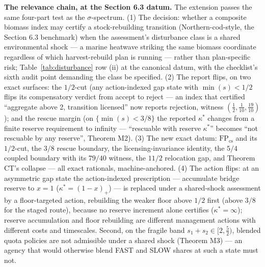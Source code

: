 \documentclass[3p,11pt]{elsarticle}
\begin{document}
\textbf{The relevance chain, at the Section 6.3 datum.} The extension
passes the same four-part test as the \(\sigma\)-spectrum. (1) The
decision: whether a composite biomass index may certify a
stock-rebuilding transition (Northern-cod-style, the Section 6.3
benchmark) when the assessment's disturbance class is a shared
environmental shock --- a marine heatwave striking the same biomass
coordinate regardless of which harvest-rebuild plan is running ---
rather than plan-specific risk; Table~\ref{tab:disturbance} row (ii) at
the canonical datum, with the checklist's sixth audit point demanding
the class be specified. (2) The report flips, on two exact surfaces: the
\(1/2\)-cut (any action-indexed gap state with \(\min(s) < 1/2\)
flips its compensatory verdict from accept to reject --- an index that
certified ``aggregate above 2, transition licensed'' now reports
rejection, witness \((\tfrac12, \tfrac1{10}, \tfrac{19}{10})\)); and
the rescue margin (on \(\{\min(s) < 3/8\}\) the reported
\(\kappa^*\) changes from a finite reserve requirement to infinity
--- ``rescuable with reserve \(\kappa^*\)'' becomes ``not rescuable
by any reserve'', Theorem M2). (3) The new exact datum:
\(\mathrm{FP}_{\mathrm{cs}}\) and its \(1/2\)-cut, the \(3/8\)
rescue boundary, the licensing-invariance identity, the \(5/4\)
coupled boundary with its \(79/40\) witness, the \(11/2\)
relocation gap, and Theorem CT's collapse --- all exact rationals,
machine-anchored. (4) The action flips: at an asymmetric gap state the
action-indexed prescription --- accumulate bridge reserve to \(x =
1\) (\(\kappa^* = (1 - x)_+\)) --- is replaced under a shared-shock
assessment by a floor-targeted action, rebuilding the weaker floor above
\(1/2\) first (above \(3/8\) for the staged route), because no
reserve increment alone certifies (\(\kappa^* = \infty\)); reserve
accumulation and floor rebuilding are different management actions with
different costs and timescales. Second, on the fragile band \(s_1 +
s_2 \in [2, \tfrac52)\), blended quota policies are not admissible
under a shared shock (Theorem M3) --- an agency that would otherwise
blend FAST and SLOW shares at such a state must not.
\end{document}
